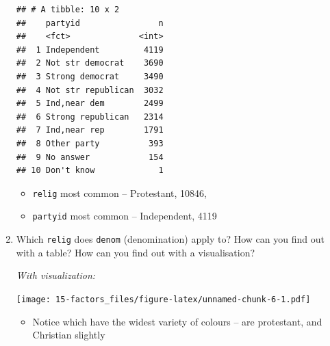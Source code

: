 \documentclass[]{book}
\newenvironment{Shaded}{\begin{snugshade}}{\end{snugshade}}
\newcommand{\DataTypeTok}[1]{\textcolor[rgb]{0.13,0.29,0.53}{#1}}
\newcommand{\KeywordTok}[1]{\textcolor[rgb]{0.13,0.29,0.53}{\textbf{#1}}}
\newcommand{\NormalTok}[1]{#1}
\newcommand{\OperatorTok}[1]{\textcolor[rgb]{0.81,0.36,0.00}{\textbf{#1}}}
\newcommand{\OtherTok}[1]{\textcolor[rgb]{0.56,0.35,0.01}{#1}}
\newcommand{\StringTok}[1]{\textcolor[rgb]{0.31,0.60,0.02}{#1}}
\providecommand{\tightlist}{%
  \setlength{\itemsep}{0pt}\setlength{\parskip}{0pt}}
\theoremstyle{definition}
\theoremstyle{definition}
\theoremstyle{definition}
\theoremstyle{remark}
\begin{document}
\begin{enumerate}
\begin{Shaded}
\end{Shaded}

\begin{verbatim}
## # A tibble: 10 x 2
##    partyid                n
##    <fct>              <int>
##  1 Independent         4119
##  2 Not str democrat    3690
##  3 Strong democrat     3490
##  4 Not str republican  3032
##  5 Ind,near dem        2499
##  6 Strong republican   2314
##  7 Ind,near rep        1791
##  8 Other party          393
##  9 No answer            154
## 10 Don't know             1
\end{verbatim}

  \begin{itemize}
  \tightlist
  \item
    \texttt{relig} most common -- Protestant, 10846,
  \item
    \texttt{partyid} most common -- Independent, 4119
  \end{itemize}
\item
  Which \texttt{relig} does \texttt{denom} (denomination) apply to? How
  can you find out with a table? How can you find out with a
  visualisation?

  \emph{With visualization:}

\begin{Shaded}
\end{Shaded}

  \texttt{[image: 15-factors\_files/figure-latex/unnamed-chunk-6-1.pdf]}

  \begin{itemize}
  \tightlist
  \item
    Notice which have the widest variety of colours -- are protestant,
    and Christian slightly
  \end{itemize}


\end{enumerate}
\end{document}
